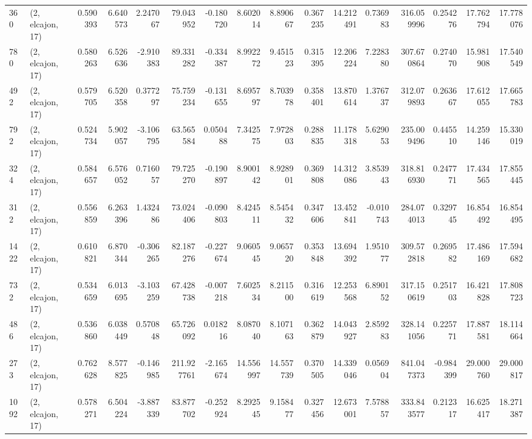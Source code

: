 \begin{tabular}{llrrrrrrrrrrrrrr}
360  &  (2, elcajon, 17) &   0.590393 &   6.640573 &   2.247067 &     79.043952 &   -0.180720 &    8.602014 &    8.890667 &  0.367235 &  14.212491 &   0.736983 &   316.059996 &   0.254276 &  17.762794 &  17.778076 \\
780  &  (2, elcajon, 17) &   0.580263 &   6.526636 &  -2.910383 &     89.331282 &   -0.334387 &    8.992272 &    9.451523 &  0.315395 &  12.206224 &   7.228380 &   307.670864 &   0.274070 &  15.981908 &  17.540549 \\
492  &  (2, elcajon, 17) &   0.579705 &   6.520358 &   0.377297 &     75.759234 &   -0.131655 &    8.695797 &    8.703978 &  0.358401 &  13.870614 &   1.376737 &   312.079893 &   0.263667 &  17.612055 &  17.665783 \\
792  &  (2, elcajon, 17) &   0.524734 &   5.902057 &  -3.106795 &     63.565584 &    0.050488 &    7.342575 &    7.972803 &  0.288835 &  11.178318 &   5.629053 &   235.009496 &   0.445510 &  14.259146 &  15.330019 \\
324  &  (2, elcajon, 17) &   0.584657 &   6.576052 &   0.716057 &     79.725270 &   -0.190897 &    8.900142 &    8.928901 &  0.369808 &  14.312086 &   3.853943 &   318.816930 &   0.247771 &  17.434565 &  17.855445 \\
312  &  (2, elcajon, 17) &   0.556859 &   6.263396 &   1.432486 &     73.024406 &   -0.090803 &    8.424511 &    8.545432 &  0.347606 &  13.452841 &  -0.010743 &   284.074013 &   0.329745 &  16.854492 &  16.854495 \\
1422 &  (2, elcajon, 17) &   0.610821 &   6.870344 &  -0.306265 &     82.187276 &   -0.227674 &    9.060545 &    9.065720 &  0.353848 &  13.694392 &   1.951077 &   309.572818 &   0.269582 &  17.486169 &  17.594682 \\
732  &  (2, elcajon, 17) &   0.534659 &   6.013695 &  -3.103259 &     67.428738 &   -0.007218 &    7.602534 &    8.211500 &  0.316619 &  12.253568 &   6.890152 &   317.150619 &   0.251703 &  16.421828 &  17.808723 \\
486  &  (2, elcajon, 17) &   0.536860 &   6.038449 &   0.570848 &     65.726092 &    0.018216 &    8.087040 &    8.107163 &  0.362879 &  14.043927 &   2.859283 &   328.141056 &   0.225771 &  17.887581 &  18.114664 \\
273  &  (2, elcajon, 17) &   0.762628 &   8.577825 &  -0.146985 &    211.927761 &   -2.165674 &   14.556997 &   14.557739 &  0.370505 &  14.339046 &   0.056904 &   841.047373 &  -0.984399 &  29.000760 &  29.000817 \\
1092 &  (2, elcajon, 17) &   0.578271 &   6.504224 &  -3.887339 &     83.877702 &   -0.252924 &    8.292545 &    9.158477 &  0.327456 &  12.673001 &   7.578857 &   333.843577 &   0.212317 &  16.625417 &  18.271387 \\

\end{tabular}
